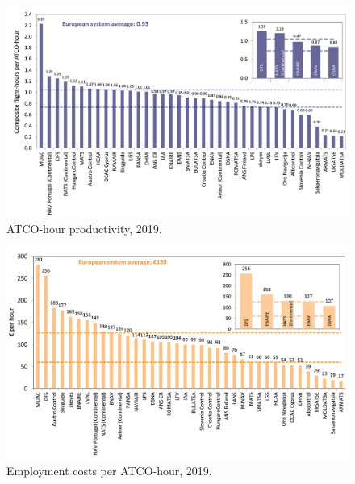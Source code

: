 \documentclass[
]{book}
\begin{document}
\begin{figure}

{\centering \includegraphics[width=1\linewidth]{figures/Figure 4-5} 

}

\caption{ATCO-hour productivity, 2019.}\label{fig:figure15}
\end{figure}



\begin{figure}

{\centering \includegraphics[width=1\linewidth]{figures/Figure 4-6} 

}

\caption{Employment costs per ATCO-hour, 2019.}\label{fig:figure16}
\end{figure}
\end{document}
